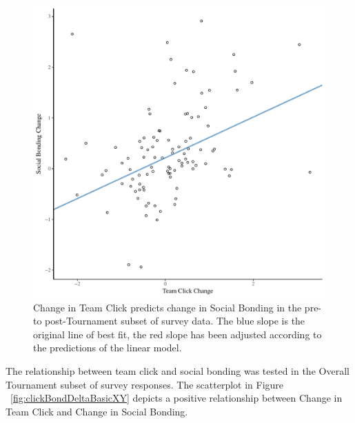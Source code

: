   \begin{figure}[htbp]
    \centering
  \includegraphics[scale=.5]{images/clickBondDeltaModelSlope.pdf}
    \caption{Change in Team Click predicts change in Social Bonding in the pre- to post-Tournament subset of survey data. The blue slope is the original line of best fit, the red slope has been adjusted according to the predictions of the linear model.}
    \label{fig:clickBondDeltaModelSlope}
  \end{figure}


   The relationship between team click and social bonding was tested in the Overall Tournament subset of survey responses. The scatterplot in Figure ~\ref{fig:clickBondDeltaBasicXY} depicts a positive relationship between Change in Team Click and Change in Social Bonding.

